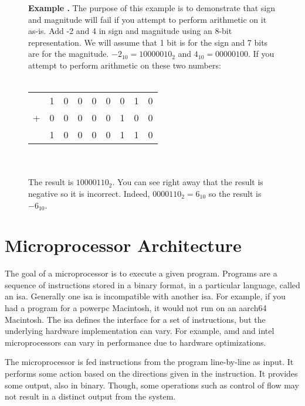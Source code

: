 \documentclass[letterpaper, 12pt]{book}
\newcommand*{\example}[1]{\noindent
    \colorbox{blue!10}{\noindent
        \begin{minipage}{\textwidth}
            \textbf{Example \thechapter.\arabic{examples}}\stepcounter{examples}
            #1
        \end{minipage}
    }
}
\begin{document}
\begin{figure}[h!]
    \example{%
        The purpose of this example is to demonstrate that sign and magnitude will fail if you attempt to perform %
        arithmetic on it as-is. Add -2 and 4 in sign and magnitude using an 8-bit representation. We will assume %
        that 1 bit is for the sign and 7 bits are for the magnitude. $-2_{10} = 10000010_2$ and $4_{10} = 00000100$. %
        If you attempt to perform arithmetic on these two numbers:\\\\
        \begin{tabular}{rrrrrrrrr}%
              & 1 & 0 & 0 & 0 & 0 & 0 & 1 & 0 \\ %
            + & 0 & 0 & 0 & 0 & 0 & 1 & 0 & 0 \\ \hline %
              & 1 & 0 & 0 & 0 & 0 & 1 & 1 & 0\\ %
        \end{tabular}\\\\
        The result is $10000110_2$. You can see right away that the result is negative so it is incorrect. %
        Indeed, $0000110_2=6_{10}$ so the result is $-6_{10}$.%
    }
\end{figure}

\chapter{Microprocessor Architecture}

The goal of a microprocessor is to execute a given program. Programs are a sequence of instructions %
stored in a binary format, in a %
particular language, called an \gls{isa}. Generally one \gls{isa} is incompatible with another \gls{isa}. 
For example, if you had a program for a \gls{powerpc} Macintosh, it would not run on an \gls{aarch64} Macintosh. %
The \gls{isa} defines the interface for a set of instructions, but the underlying hardware implementation 
can vary. For example, \gls{amd} and \gls{intel} microprocessors can vary in performance due to hardware 
optimizations.

The microprocessor is fed %
instructions from the program line-by-line as input. It performs some action based on the directions given in 
the instruction. It provides some output, also in binary. Though, some operations such as \gls{control of flow} 
may not result in a distinct output from the system. %
\end{document}
